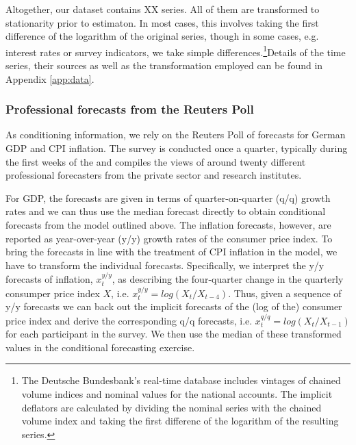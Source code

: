 \documentclass[notitlepage,a4paper,12pt]{article}
\begin{document}
Altogether, our dataset contains XX series. All of them are transformed to stationarity prior to estimaton. In most cases, this involves taking the first difference of the logarithm of the original series, though in some cases, e.g. interest rates or survey indicators, we take simple differences.\footnote{The Deutsche Bundesbank's real-time database includes vintages of chained volume indices and nominal values for the national accounts. The implicit deflators are calculated by dividing the nominal series with the chained volume index and taking the first differenc of the logarithm of the resulting series.}Details of the time series, their sources as well as the transformation employed  can be found in Appendix \ref{app:data}.

\subsubsection{Professional forecasts from the Reuters Poll}

As conditioning information, we rely on the Reuters Poll of forecasts for German GDP and CPI inflation. The survey is conducted once a quarter, typically during the first weeks of the  and compiles the views of around twenty different professional forecasters from the private sector and research institutes. 

For GDP, the forecasts are given in terms of quarter-on-quarter (q/q) growth rates and we can thus use the median forecast directly to obtain conditional forecasts from the model outlined above. The inflation forecasts, however, are reported as year-over-year (y/y) growth rates of the consumer price index. To bring the forecasts in line with the treatment of CPI inflation in the model, we have to transform the individual forecasts. Specifically, we interpret the y/y forecasts of inflation, $x_t^{y/y}$, as describing the four-quarter change in the quarterly consumper price index $X$, i.e. $ x_t^{y/y} = log(X_t/X_{t-4})$. Thus, given a sequence of y/y forecasts we can back out the implicit forecasts of the (log of the) consumer price index and derive the corresponding q/q forecasts, i.e. $ x_t^{q/q} = log(X_t/X_{t-1})$ for each participant in the survey. We then use the median of these transformed values in the conditional forecasting exercise.
\end{document}
